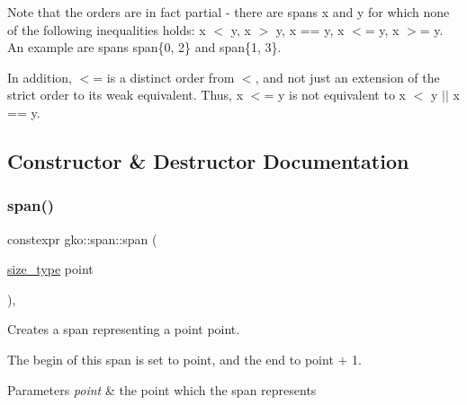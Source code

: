 Note that the orders are in fact partial -\/ there are spans {\ttfamily x} and {\ttfamily y} for which none of the following inequalities holds\+: {\ttfamily x $<$ y}, {\ttfamily x $>$ y}, {\ttfamily x == y}, {\ttfamily x $<$= y}, {\ttfamily x $>$= y}. An example are spans {\ttfamily span\{0, 2\}} and {\ttfamily span\{1, 3\}}.

In addition, {\ttfamily $<$=} is a distinct order from {\ttfamily $<$}, and not just an extension of the strict order to its weak equivalent. Thus, {\ttfamily x $<$= y} is not equivalent to {\ttfamily x $<$ y $\vert$$\vert$ x == y}. 

\subsection{Constructor \& Destructor Documentation}
\mbox{\label{structgko_1_1span_a2aafb0414ef14fac91296066f7426d6d}} 
\subsubsection{\texorpdfstring{span()}{span()}\hspace{0.1cm}{\footnotesize\ttfamily [1/2]}}
{\footnotesize\ttfamily constexpr gko\+::span\+::span (\begin{DoxyParamCaption}\item[{\hyperlink{namespacegko_a6e5c95df0ae4e47aab2f604a22d98ee7}{size\+\_\+type}}]{point }\end{DoxyParamCaption})\hspace{0.3cm}{\ttfamily [inline]}, {\ttfamily [noexcept]}}



Creates a span representing a point {\ttfamily point}. 

The {\ttfamily begin} of this span is set to {\ttfamily point}, and the {\ttfamily end} to {\ttfamily point + 1}.


\begin{DoxyParams}{Parameters}
{\em point} & the point which the span represents \\
\hline
\end{DoxyParams}
\mbox{\label{structgko_1_1span_a1566e1ab67312a6b9ece66fa4f5c8799}} 

